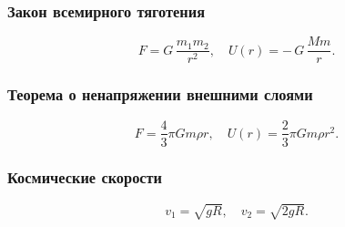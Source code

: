 \documentclass[12pt, a4paper]{article}
\begin{document}
\subsubsection*{Закон всемирного тяготения}
\[
F = G\,\frac{m_1m_2}{r^2},
\quad
U(r) = -\,G\,\frac{Mm}{r}.
\]

\subsubsection*{Теорема о ненапряжении внешними слоями}
\[
F = \frac43\pi Gm\rho r,
\quad
U(r) = \frac23\pi Gm\rho r^2.
\]

\subsubsection*{Космические скорости}
\[
v_1 = \sqrt{gR},
\quad
v_2 = \sqrt{2gR}.
\]
\end{document}

